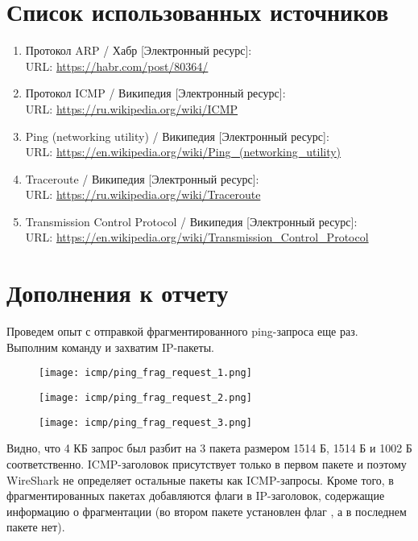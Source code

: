 \section*{Список использованных источников}

\begin{enumerate}
	\item Протокол ARP / Хабр [Электронный ресурс]:\\
		URL: {\small\url{https://habr.com/post/80364/}}
	\item Протокол ICMP / Википедия [Электронный ресурс]:\\
		URL: {\small\url{https://ru.wikipedia.org/wiki/ICMP}}
	\item Ping (networking utility) / Википедия  [Электронный ресурс]:\\
		URL: {\small\url{https://en.wikipedia.org/wiki/Ping_(networking_utility)}}
	\item Traceroute / Википедия [Электронный ресурс]:\\
		URL: {\small\url{https://ru.wikipedia.org/wiki/Traceroute}}
	\item Transmission Control Protocol / Википедия  [Электронный ресурс]:\\
		URL: {\small\url{https://en.wikipedia.org/wiki/Transmission_Control_Protocol}}
\end{enumerate}

\section*{Дополнения к отчету}

Проведем опыт с отправкой фрагментированного ping-запроса еще раз. Выполним команду  и захватим IP-пакеты.

\begin{figure}[H]
	\centering
	\texttt{[image: icmp/ping\_frag\_request\_1.png]}
\end{figure}
\vspace{-1.8em}
\begin{figure}[H]
	\centering
	\texttt{[image: icmp/ping\_frag\_request\_2.png]}
\end{figure}
\vspace{-1.8em}
\begin{figure}[H]
	\centering
	\texttt{[image: icmp/ping\_frag\_request\_3.png]}
\end{figure}

Видно, что 4 КБ запрос был разбит на 3 пакета размером 1514 Б, 1514 Б и 1002 Б соответственно. ICMP-заголовок присутствует только в первом пакете и поэтому WireShark не определяет остальные пакеты как ICMP-запросы. Кроме того, в фрагментированных пакетах добавляются флаги в IP-заголовок, содержащие информацию о фрагментации (во втором пакете установлен флаг , а в последнем пакете нет).

